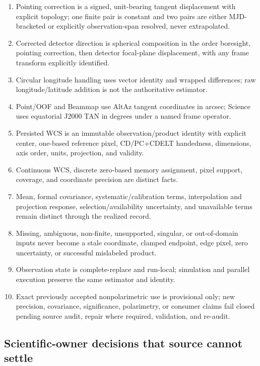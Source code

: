 \documentclass[11pt]{article}
\begin{document}
\begin{enumerate}[label=IC\arabic*.]
\item Pointing correction is a signed, unit-bearing tangent displacement with
explicit topology; one finite pair is constant and two pairs are either MJD-
bracketed or explicitly observation-span resolved, never extrapolated.
\item Corrected detector direction is spherical composition in the order
boresight, pointing correction, then detector focal-plane displacement, with
any frame transform explicitly identified.
\item Circular longitude handling uses vector identity and wrapped differences;
raw longitude/latitude addition is not the authoritative estimator.
\item Point/OOF and Beammap use AltAz tangent coordinates in arcsec; Science
uses equatorial J2000 TAN in degrees under a named frame operator.
\item Persisted WCS is an immutable observation/product identity with explicit
center, one-based reference pixel, CD/PC+CDELT handedness, dimensions, axis
order, units, projection, and validity.
\item Continuous WCS, discrete zero-based memory assignment, pixel support,
coverage, and coordinate precision are distinct facts.
\item Mean, formal covariance, systematic/calibration terms, interpolation and
projection response, selection/availability uncertainty, and unavailable
terms remain distinct through the realized record.
\item Missing, ambiguous, non-finite, unsupported, singular, or out-of-domain
inputs never become a stale coordinate, clamped endpoint, edge pixel, zero
uncertainty, or successful mislabeled product.
\item Observation state is complete-replace and run-local; simulation and
parallel execution preserve the same estimator and identity.
\item Exact previously accepted nonpolarimetric use is provisional only; new
precision, covariance, significance, polarimetry, or consumer claims fail
closed pending source audit, repair where required, validation, and re-audit.
\end{enumerate}

\subsection{Scientific-owner decisions that source cannot settle}
\end{document}
